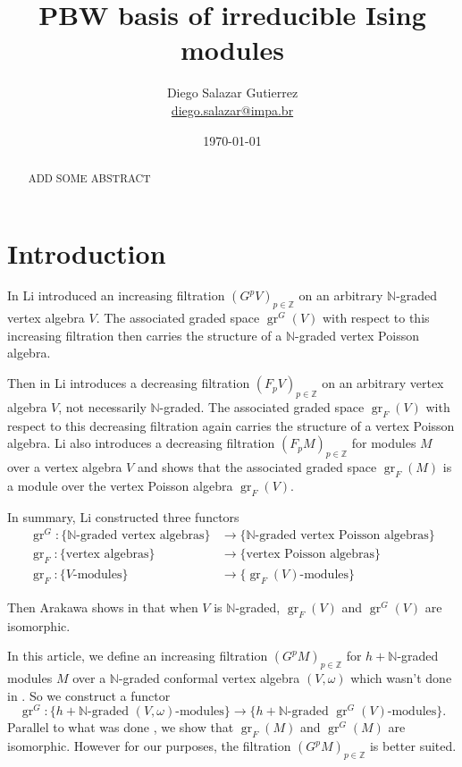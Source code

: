 \documentclass[12pt,a4paper]{article}
\DeclareMathOperator{\gr}{gr}
\begin{document}
\title{PBW basis of irreducible Ising modules}
\author{Diego Salazar Gutierrez \\ \href{mailto:diego.salazar@impa.br}{diego.salazar@impa.br}}
\date{\today}
\maketitle

\begin{abstract}
  ADD SOME ABSTRACT
\end{abstract}

\section{Introduction}
\label{sec:introduction}

In \cite{li_vertex_2002} Li introduced an increasing filtration $(G^pV)_{p\in \mathbb{Z}}$ on an arbitrary $\mathbb{N}$-graded vertex algebra $V$.
The associated graded space $\gr^G(V)$ with respect to this increasing filtration then carries the structure of a $\mathbb{N}$-graded vertex Poisson algebra.

Then in \cite{li_abelianizing_2005} Li introduces a decreasing filtration $(F_pV)_{p\in \mathbb{Z}}$ on an arbitrary vertex algebra $V$, not necessarily $\mathbb{N}$-graded.
The associated graded space $\gr_F(V)$ with respect to this decreasing filtration again carries the structure of a vertex Poisson algebra.
Li also introduces a decreasing filtration $(F_pM)_{p\in \mathbb{Z}}$ for modules $M$ over a vertex algebra $V$ and shows that the associated graded space $\gr_F(M)$ is a module over the vertex Poisson algebra $\gr_F(V)$.

In summary, Li constructed three functors
\begin{align*}
  \gr^G:\{\text{$\mathbb{N}$-graded vertex algebras}\}&\to \{\text{$\mathbb{N}$-graded vertex Poisson algebras}\} \\
  \gr_F:\{\text{vertex algebras}\}&\to \{\text{vertex Poisson algebras}\} \\
  \gr_F:\{\text{$V$-modules}\}&\to \{\text{$\gr_F(V)$-modules}\}
\end{align*}

Then Arakawa shows in \cite[Proposition 2.6.1]{arakawa_remark_2012} that when $V$ is $\mathbb{N}$-graded, $\gr_F(V)$ and $\gr^G(V)$ are isomorphic.

In this article, we define an increasing filtration $(G^pM)_{p\in \mathbb{Z}}$ for $h+\mathbb{N}$-graded modules $M$ over a $\mathbb{N}$-graded conformal vertex algebra $(V,\omega)$ which wasn't done in \cite{li_vertex_2002}.
So we construct a functor
\begin{equation*}
  \gr^G:\{\text{$h+\mathbb{N}$-graded $(V,\omega)$-modules}\}\to \{\text{$h+\mathbb{N}$-graded $\gr^G(V)$-modules}\}.
\end{equation*}
Parallel to what was done \cite{arakawa_remark_2012}, we show that $\gr_F(M)$ and $\gr^G(M)$ are isomorphic.
However for our purposes, the filtration $(G^pM)_{p\in \mathbb{Z}}$ is better suited.
\end{document}
